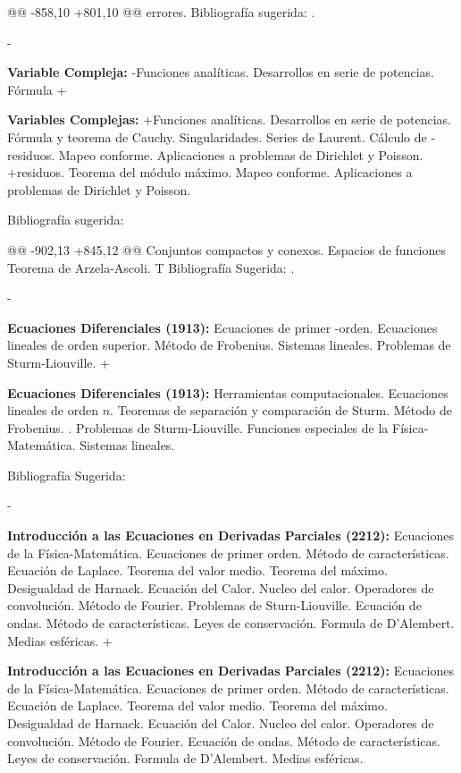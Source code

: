 \begin{description}
@@ -858,10 +801,10 @@ errores.
 Bibliografía sugerida: \cite{roederer, sears}.
 
 
-\item\textbf{Variable Compleja:}
-Funciones analíticas. Desarro\-llos en serie de potencias. Fórmula
+\item\textbf{Variables Complejas:}
+Funciones analíticas. Desarrollos en serie de potencias. Fórmula
 y teorema de Cauchy. Singularidades. Series de Laurent. Cálculo de
-residuos. Mapeo conforme. Aplicaciones a problemas de Dirichlet y Poisson.
+residuos. Teorema del módulo máximo. Mapeo conforme. Aplicaciones a problemas de Dirichlet y Poisson.
 
 Bibliografía sugerida: \cite{ahlfors, churchill,conway}
 
@@ -902,13 +845,12 @@ Conjuntos compactos y conexos. Espacios de funciones Teorema de Arzela-Ascoli. T
 Bibliografía Sugerida: \cite{dugundji, kelley,
 munkres, morris1989topology,  JohnMcCleary84,StefanWaldmann87,JohnB.Conway251, RobertAConover507}.
 
-\item\textbf{Ecuaciones Diferenciales (1913):} Ecuaciones de primer
-orden. Ecuaciones lineales de orden superior. Método de Frobenius. Sistemas lineales. Problemas de Sturm-Liouville.
+\item\textbf{Ecuaciones Diferenciales (1913):} Herramientas computacionales.  Ecuaciones lineales de orden $n$. Teoremas de separación y comparación de Sturm. Método de Frobenius. . Problemas de Sturm-Liouville. Funciones especiales de la Física-Matemática.  Sistemas lineales. 
 
 Bibliografía Sugerida: \cite{ GeorgeFinlaySimmons487,WilliamE.Boyce496, MorrisW.Hirsch540,JorgeSotomayor513,BarbaraD.MacCluer515,RichardS.Palais519,GarrettBirkhoff526}
 
 
-\item\textbf{Introducción a las Ecuaciones en Derivadas Parciales (2212):}  Ecuaciones de la Física-Matemática. Ecuaciones de primer orden. Método de características. Ecuación de Laplace. Teorema del valor medio. Teorema del máximo. Desigualdad de Harnack. Ecuación del Calor. Nucleo del calor. Operadores de convolución.  Método de Fourier. Problemas de Sturn-Liouville.  Ecuación de ondas. Método de características. Leyes de conservación. Formula de D'{}Alembert. Medias esféricas. 
+\item\textbf{Introducción a las Ecuaciones en Derivadas Parciales (2212):}  Ecuaciones de la Física-Matemática. Ecuaciones de primer orden. Método de características. Ecuación de Laplace. Teorema del valor medio. Teorema del máximo. Desigualdad de Harnack. Ecuación del Calor. Nucleo del calor. Operadores de convolución.  Método de Fourier.    Ecuación de ondas. Método de características. Leyes de conservación. Formula de D'{}Alembert. Medias esféricas. 
 

\end{description}
